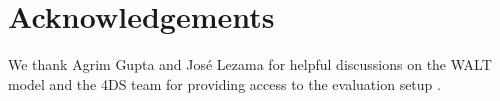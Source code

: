 \section*{Acknowledgements}
\label{sec:acknowledgements}
We thank Agrim Gupta and José Lezama for helpful discussions on the WALT model and the 4DS team for providing access to the evaluation setup \cite{s4dpaper}.

